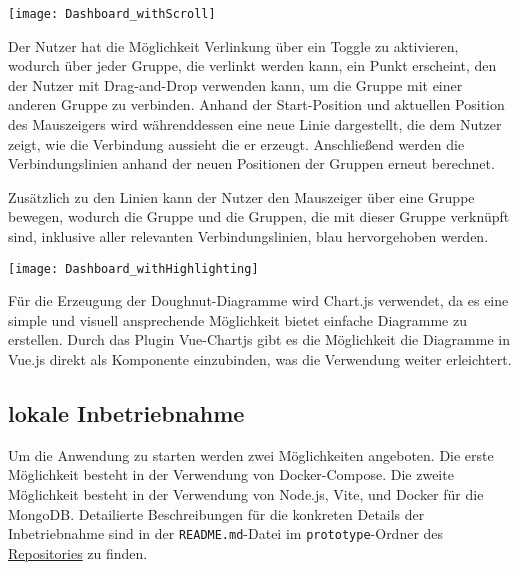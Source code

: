 \vspace{20pt}
\begin{center}
    \begin{minipage}{1\linewidth}
        \texttt{[image: Dashboard\_withScroll]}
    \end{minipage}
\end{center}
\vspace{20pt}

Der Nutzer hat die Möglichkeit Verlinkung über ein Toggle zu aktivieren, wodurch über jeder Gruppe, die verlinkt werden kann, ein Punkt erscheint, den der Nutzer mit Drag-and-Drop verwenden kann, um die Gruppe mit einer anderen Gruppe zu verbinden.
Anhand der Start-Position und aktuellen Position des Mauszeigers wird währenddessen eine neue Linie dargestellt, die dem Nutzer zeigt, wie die Verbindung aussieht die er erzeugt. Anschließend werden die Verbindungslinien anhand der neuen Positionen der Gruppen erneut berechnet.

Zusätzlich zu den Linien kann der Nutzer den Mauszeiger über eine Gruppe bewegen, wodurch die Gruppe und die Gruppen, die mit dieser Gruppe verknüpft sind, inklusive aller relevanten Verbindungslinien, blau hervorgehoben werden.

\vspace{20pt}
\begin{center}
    \begin{minipage}{1\linewidth}
        \texttt{[image: Dashboard\_withHighlighting]}
    \end{minipage}
\end{center}
\vspace{20pt}

Für die Erzeugung der Doughnut-Diagramme wird Chart.js verwendet, da es eine simple und visuell ansprechende Möglichkeit bietet einfache Diagramme zu erstellen. Durch das Plugin Vue-Chartjs gibt es die Möglichkeit die Diagramme in Vue.js direkt als Komponente einzubinden, was die Verwendung weiter erleichtert.

\subsection{lokale Inbetriebnahme}
Um die Anwendung zu starten werden zwei Möglichkeiten angeboten. Die erste Möglichkeit besteht in der Verwendung von Docker-Compose. Die zweite Möglichkeit besteht in der Verwendung von Node.js, Vite, und Docker für die MongoDB.
Detailierte Beschreibungen für die konkreten Details der Inbetriebnahme sind in der \verb|README.md|-Datei im \verb|prototype|-Ordner des \href{https://github.com/Max-0e/bachelor/blob/main/prototype/README.md}{Repositories} zu finden.

